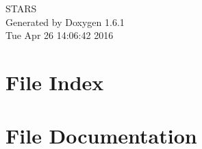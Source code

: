 \documentclass[a4paper]{book}
\begin{document}
\hypersetup{pageanchor=false}
\begin{titlepage}
\vspace*{7cm}
\begin{center}
{\Large STARS }\\
\vspace*{1cm}
{\large Generated by Doxygen 1.6.1}\\
\vspace*{0.5cm}
{\small Tue Apr 26 14:06:42 2016}\\
\end{center}
\end{titlepage}
\clearemptydoublepage
{}
\tableofcontents
\clearemptydoublepage
{}
\hypersetup{pageanchor=true}
\chapter{File Index}

\chapter{File Documentation}






























\printindex
\end{document}

